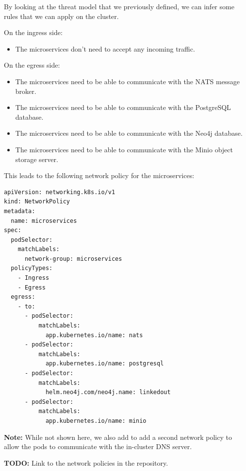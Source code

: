 \documentclass[12pt,x11names]{article}
\begin{document}
\medskip
By looking at the threat model that we previously defined, we can infer some rules that
we can apply on the cluster.

\medskip
On the ingress side:

\begin{itemize}
  \item The microservices don't need to accept any incoming traffic.
\end{itemize}

On the egress side:

\begin{itemize}
  \item The microservices need to be able to communicate with the NATS message broker.
  \item The microservices need to be able to communicate with the PostgreSQL database.
  \item The microservices need to be able to communicate with the Neo4j database.
  \item The microservices need to be able to communicate with the Minio object storage server.
\end{itemize}

This leads to the following network policy for the microservices:

\begin{lstlisting}
apiVersion: networking.k8s.io/v1
kind: NetworkPolicy
metadata:
  name: microservices
spec:
  podSelector:
    matchLabels:
      network-group: microservices
  policyTypes:
    - Ingress
    - Egress
  egress:
    - to:
      - podSelector:
          matchLabels:
            app.kubernetes.io/name: nats
      - podSelector:
          matchLabels:
            app.kubernetes.io/name: postgresql
      - podSelector:
          matchLabels:
            helm.neo4j.com/neo4j.name: linkedout
      - podSelector:
          matchLabels:
            app.kubernetes.io/name: minio  
\end{lstlisting}

\textbf{Note:} While not shown here, we also add to add a second network policy to allow
the pods to communicate with the in-cluster DNS server.

\medskip
\textbf{TODO:} Link to the network policies in the repository.
\end{document}
